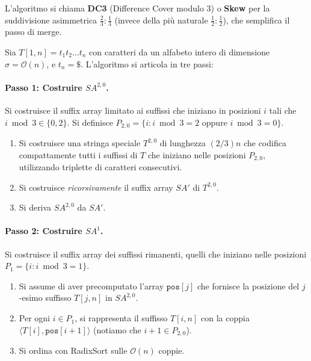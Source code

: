 \documentclass[12pt, a4paper, oneside]{book}
\theoremstyle{plain}
\theoremstyle{definition}
\theoremstyle{remark}
\newcommand{\OO}[1]{\mathcal{O}\!\left(#1\right)}
\begin{document}
L'algoritmo si chiama \textbf{DC3} (Difference Cover modulo 3) o \textbf{Skew} per la suddivisione asimmetrica $\frac{2}{3} : \frac{1}{3}$ (invece della più naturale $\frac{1}{2} : \frac{1}{2}$), che semplifica il passo di merge.

Sia $T[1,n] = t_1 t_2 \ldots t_n$ con caratteri da un alfabeto intero di dimensione $\sigma = \OO{n}$, e $t_n = \$$. L'algoritmo si articola in tre passi:

\paragraph{Passo 1: Costruire $SA^{2,0}$.}
Si costruisce il suffix array limitato ai suffissi che iniziano in posizioni $i$ tali che $i \bmod 3 \in \{0, 2\}$. Si definisce $P_{2,0} = \{i : i \bmod 3 = 2 \text{ oppure } i \bmod 3 = 0\}$.

\begin{enumerate}
  \item Si costruisce una stringa speciale $T^{2,0}$ di lunghezza $(2/3)n$ che codifica compattamente tutti i suffissi di $T$ che iniziano nelle posizioni $P_{2,0}$, utilizzando triplette di caratteri consecutivi.
  \item Si costruisce \emph{ricorsivamente} il suffix array $SA'$ di $T^{2,0}$.
  \item Si deriva $SA^{2,0}$ da $SA'$.
\end{enumerate}

\paragraph{Passo 2: Costruire $SA^1$.}
Si costruisce il suffix array dei suffissi rimanenti, quelli che iniziano nelle posizioni $P_1 = \{i : i \bmod 3 = 1\}$.

\begin{enumerate}
  \item Si assume di aver precomputato l'array $\mathtt{pos}[j]$ che fornisce la posizione del $j$-esimo suffisso $T[j,n]$ in $SA^{2,0}$.
  \item Per ogni $i \in P_1$, si rappresenta il suffisso $T[i,n]$ con la coppia $\langle T[i], \mathtt{pos}[i+1] \rangle$ (notiamo che $i+1 \in P_{2,0}$).
  \item Si ordina con RadixSort sulle $\OO{n}$ coppie.
\end{enumerate}
\end{document}
